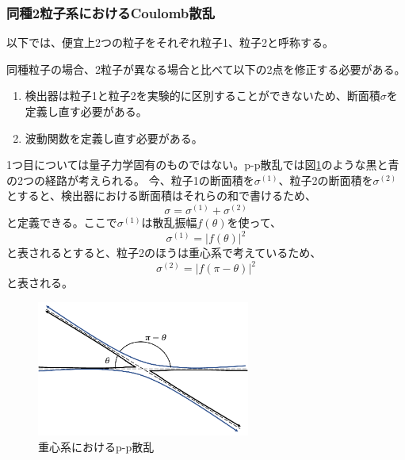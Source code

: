 \documentclass[a4paper,11pt,dvipdfmx]{jsarticle}
\begin{document}
\newpage
\subsubsection{同種2粒子系におけるCoulomb散乱\cite{2017}}
以下では、便宜上2つの粒子をそれぞれ粒子1、粒子2と呼称する。

同種粒子の場合、2粒子が異なる場合と比べて以下の2点を修正する必要がある。
\begin{enumerate}
    \item 検出器は粒子1と粒子2を実験的に区別することができないため、断面積$\sigma$を定義し直す必要がある。
    \item 波動関数を定義し直す必要がある。
\end{enumerate}

1つ目については量子力学固有のものではない。p-p散乱では図\ref{fig:ppcm}のような黒と青の2つの経路が考えられる。
今、粒子1の断面積を$\sigma^{(1)}$、粒子2の断面積を$\sigma^{(2)}$とすると、検出器における断面積はそれらの和で書けるため、
\begin{equation*}
    \sigma=\sigma^{(1)}+\sigma^{(2)}
\end{equation*}
と定義できる。ここで$\sigma^{(1)}$は散乱振幅$f(\theta)$を使って、
\begin{equation*}
    \sigma^{(1)}=|f(\theta)|^{2}
\end{equation*}
と表されるとすると、粒子2のほうは重心系で考えているため、
\begin{equation*}
    \sigma^{(2)}=|f(\pi-\theta)|^{2}
\end{equation*}
と表される。
\begin{figure}[htbp]
\centering
\includegraphics[width=7cm]{picture/cstheory/p-pCM.pdf}
\caption{重心系におけるp-p散乱}
\label{fig:ppcm}
\end{figure}
\end{document}
